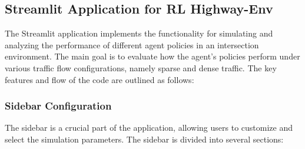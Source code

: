\subsection{Streamlit Application for RL Highway-Env}

The Streamlit application implements the functionality for simulating and analyzing the performance of different agent policies in an intersection environment.
The main goal is to evaluate how the agent's policies perform under various traffic flow configurations, namely sparse and dense traffic. 
The key features and flow of the code are outlined as follows:

\subsubsection{Sidebar Configuration}

The sidebar is a crucial part of the application, allowing users to customize and select the simulation parameters. The sidebar is divided into several sections:

